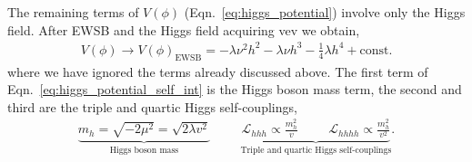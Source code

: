 The remaining terms of $V(\phi)$ (Eqn.~\ref{eq:higgs_potential}) involve only the Higgs field. After
EWSB and the Higgs field acquiring vev we obtain,
\begin{align}
	V(\phi) \rightarrow V(\phi)_{\text{EWSB}} =  -\lambda \nu^2 h^2 - \lambda \nu h^3 - \frac{1}{4} \lambda h^4 + \text{const.}
	\label{eq:higgs_potential_self_int}
\end{align}
where we have ignored the terms already discussed above. The first term of Eqn.~\ref{eq:higgs_potential_self_int}
is the Higgs boson mass term, the second and third are the triple and quartic Higgs self-couplings,
\begin{align}
	\underbrace{m_{h} = \sqrt{ - 2 \mu^2} = \sqrt{ 2 \lambda v^2 }}_\text{Higgs boson mass} \hspace{1cm} \underbrace{\mathcal{L}_{hhh} \propto \frac{m_h^2}{v} \hspace{1cm} \mathcal{L}_{hhhh} \propto \frac{m_h^2}{v^2}}_\text{Triple and quartic Higgs self-couplings}.
	\label{eq:higgs_self_couplings}
\end{align}



